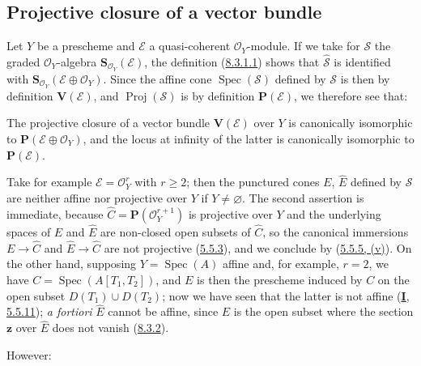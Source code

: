 \subsection{Projective closure of a vector bundle}
\label{subsection:II.8.4}

\begin{env}[8.4.1]
\label{II.8.4.1}
Let $Y$ be a prescheme and $\mathcal{E}$ a quasi-coherent $\mathcal{O}_Y$-module.
If we take for $\mathcal{S}$ the graded $\mathcal{O}_Y$-algebra
$\mathbf{S}_{\mathcal{O}_Y}(\mathcal{E})$, the definition
(\hyperref[II.8.3.1.1]{8.3.1.1}) shows that
$\widehat{\mathcal{S}}$ is identified with
$\mathbf{S}_{\mathcal{O}_Y}(\mathcal{E}\oplus\mathcal{O}_Y)$. Since the affine cone
$\operatorname{Spec}(\mathcal{S})$ defined by $\mathcal{S}$ is then by
definition $\mathbf{V}(\mathcal{E})$, and $\operatorname{Proj}(\mathcal{S})$
is by definition $\mathbf{P}(\mathcal{E})$, we therefore see that:
\end{env}

\begin{proposition}[8.4.2]
\label{II.8.4.2}
The projective closure of a vector bundle $\mathbf{V}(\mathcal{E})$ over
$Y$ is canonically isomorphic to
$\mathbf{P}(\mathcal{E}\oplus\mathcal{O}_Y)$, and the locus at infinity of the
latter is canonically isomorphic to $\mathbf{P}(\mathcal{E})$.
\end{proposition}

\begin{remark}[8.4.3]
\label{II.8.4.3}
Take for example $\mathcal{E}=\mathcal{O}_Y^r$ with $r\geq2$; then the
punctured cones $E$, $\widehat{E}$ defined by $\mathcal{S}$ are neither affine
nor projective over $Y$ if $Y\neq\varnothing$. The second assertion is
immediate, because $\widehat{C}=\mathbf{P}(\mathcal{O}_Y^{r+1})$ is projective over
$Y$ and the underlying spaces of $E$ and $\widehat{E}$ are non-closed open
subsets of $\widehat{C}$, so the canonical immersions
$E\to\widehat{C}$ and $\widehat{E}\to\widehat{C}$ are not projective
(\hyperref[II.5.5.3]{5.5.3}), and we conclude by
(\hyperref[II.5.5.5]{5.5.5, (v)}). On the other hand, supposing
$Y=\operatorname{Spec}(A)$ affine and, for example, $r=2$, we have
$C=\operatorname{Spec}(A[T_1,T_2])$, and $E$ is then the prescheme induced by
$C$ on the open subset $D(T_1)\cup D(T_2)$; now we have seen that the latter is
not affine (\hyperref[I.5.5.11]{\textbf{I}, 5.5.11});
\emph{a fortiori} $\widehat{E}$ cannot be affine, since $E$ is the open subset
where the section $\mathbf{z}$ over $\widehat{E}$ does not vanish
(\hyperref[II.8.3.2]{8.3.2}).

However:
\end{remark}

